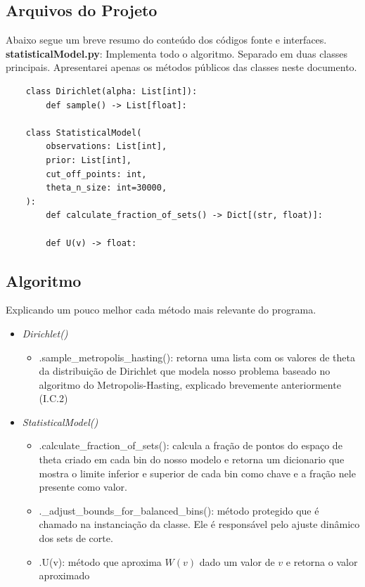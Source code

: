 \documentclass[twocolumn,amsmath,amssymb,floatfix]{revtex4}
\begin{document}
\subsection{Arquivos do Projeto}
\indent Abaixo segue um breve resumo do conteúdo dos códigos fonte e interfaces.
\indent \textbf{statisticalModel.py}: Implementa todo o algoritmo. Separado em duas classes principais. Apresentarei apenas os métodos públicos das classes neste documento.
\begin{lstlisting}
    class Dirichlet(alpha: List[int]):
        def sample() -> List[float]:

    class StatisticalModel(
        observations: List[int],
        prior: List[int],
        cut_off_points: int,
        theta_n_size: int=30000,
    ):
        def calculate_fraction_of_sets() -> Dict[(str, float)]:
        
        def U(v) -> float:
\end{lstlisting}
\subsection{Algoritmo}
\indent Explicando um pouco melhor cada método mais relevante do programa.
\begin{itemize}
    \item \textit{Dirichlet()}
    \begin{itemize}
        \item .sample\_metropolis\_hasting(): retorna uma lista com os valores de theta da distribuição de Dirichlet que modela nosso problema baseado no algoritmo do Metropolis-Hasting, explicado brevemente anteriormente (I.C.2)
    \end{itemize}
\end{itemize}
\begin{itemize}
\item \textit{StatisticalModel()}
    \begin{itemize}
        \item .calculate\_fraction\_of\_sets(): calcula a fração de pontos do espaço de theta criado em cada bin do nosso modelo e retorna um dicionario que mostra o limite inferior e superior de cada bin como chave e a fração nele presente como valor.
        \item .\_adjust\_bounds\_for\_balanced\_bins(): método protegido que é chamado na instanciação da classe. Ele é responsável pelo ajuste dinâmico dos sets de corte.
        \item .U(v): método que aproxima $W(v)$ dado um valor de $v$ e retorna o valor aproximado 
    \end{itemize}
\end{itemize}
\end{document}
